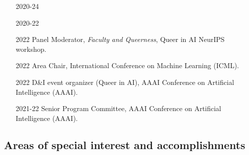 \documentclass[10pt]{article}
\begin{document}
\begin{itemize}[leftmargin=5em]
  \item[2020-24] 
  \item[2020-22] 
  \item[2022] {Panel Moderator, \emph{Faculty and Queerness}, Queer in AI NeurIPS workshop.}
  \item[2022] {Area Chair, International Conference on Machine Learning (ICML).}
  \item[2022] {D\&I event organizer (Queer in AI), AAAI Conference on Artificial Intelligence (AAAI).}
  \item[2021-22] {Senior Program Committee, AAAI Conference on Artificial Intelligence (AAAI).}
\end{itemize}









\subsection{Areas of special interest and accomplishments}

\end{document}
